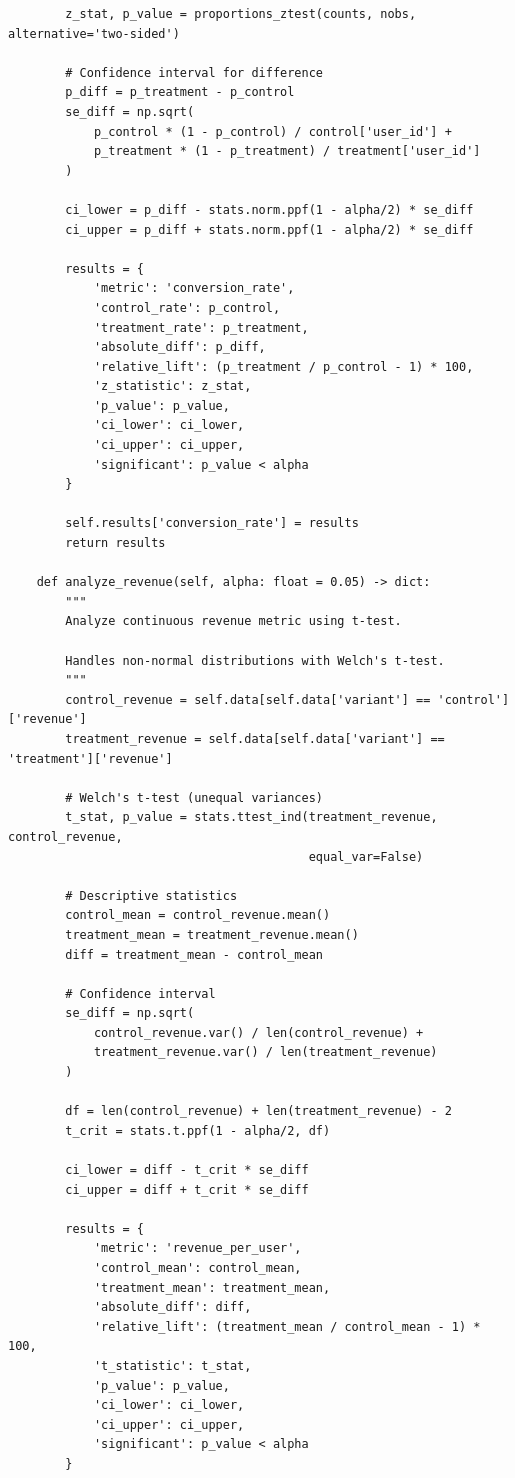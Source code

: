 \begin{lstlisting}
        z_stat, p_value = proportions_ztest(counts, nobs, alternative='two-sided')

        # Confidence interval for difference
        p_diff = p_treatment - p_control
        se_diff = np.sqrt(
            p_control * (1 - p_control) / control['user_id'] +
            p_treatment * (1 - p_treatment) / treatment['user_id']
        )

        ci_lower = p_diff - stats.norm.ppf(1 - alpha/2) * se_diff
        ci_upper = p_diff + stats.norm.ppf(1 - alpha/2) * se_diff

        results = {
            'metric': 'conversion_rate',
            'control_rate': p_control,
            'treatment_rate': p_treatment,
            'absolute_diff': p_diff,
            'relative_lift': (p_treatment / p_control - 1) * 100,
            'z_statistic': z_stat,
            'p_value': p_value,
            'ci_lower': ci_lower,
            'ci_upper': ci_upper,
            'significant': p_value < alpha
        }

        self.results['conversion_rate'] = results
        return results

    def analyze_revenue(self, alpha: float = 0.05) -> dict:
        """
        Analyze continuous revenue metric using t-test.

        Handles non-normal distributions with Welch's t-test.
        """
        control_revenue = self.data[self.data['variant'] == 'control']['revenue']
        treatment_revenue = self.data[self.data['variant'] == 'treatment']['revenue']

        # Welch's t-test (unequal variances)
        t_stat, p_value = stats.ttest_ind(treatment_revenue, control_revenue,
                                          equal_var=False)

        # Descriptive statistics
        control_mean = control_revenue.mean()
        treatment_mean = treatment_revenue.mean()
        diff = treatment_mean - control_mean

        # Confidence interval
        se_diff = np.sqrt(
            control_revenue.var() / len(control_revenue) +
            treatment_revenue.var() / len(treatment_revenue)
        )

        df = len(control_revenue) + len(treatment_revenue) - 2
        t_crit = stats.t.ppf(1 - alpha/2, df)

        ci_lower = diff - t_crit * se_diff
        ci_upper = diff + t_crit * se_diff

        results = {
            'metric': 'revenue_per_user',
            'control_mean': control_mean,
            'treatment_mean': treatment_mean,
            'absolute_diff': diff,
            'relative_lift': (treatment_mean / control_mean - 1) * 100,
            't_statistic': t_stat,
            'p_value': p_value,
            'ci_lower': ci_lower,
            'ci_upper': ci_upper,
            'significant': p_value < alpha
        }


\end{lstlisting}
